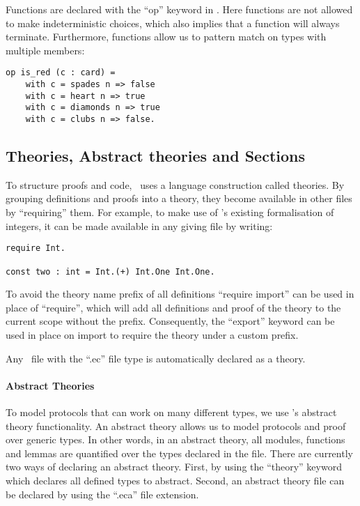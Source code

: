 \noindent
Functions are declared with the ``op'' keyword in \easycrypt.
Here functions are not allowed to make indeterministic choices, which also
implies that a function will always terminate.
Furthermore, functions allow us to pattern match on types with
multiple members:
\begin{lstlisting}
op is_red (c : card) =
    with c = spades n => false
    with c = heart n => true
    with c = diamonds n => true
    with c = clubs n => false.
\end{lstlisting}


\subsection{Theories, Abstract theories and Sections}
\label{sec:ec_theories}
To structure proofs and code, \easycrypt\ uses a language construction called
theories. By grouping definitions and proofs into a theory, they become available
in other files by ``requiring'' them. For example, to make use of \easycrypt's
existing formalisation of integers, it can be made available in any giving file
by writing:

\begin{lstlisting}
require Int.

const two : int = Int.(+) Int.One Int.One.
\end{lstlisting}

To avoid the theory name prefix of all definitions ``require import'' can be
used in place of ``require'', which will add all definitions and proof of the
theory to the current scope without the prefix. Consequently, the ``export''
keyword can be used in place on import to require the theory under a custom prefix.

Any \easycrypt\ file with the ``.ec'' file type is automatically declared as a
theory.

\paragraph{Abstract Theories}
To model protocols that can work on many different
types, we use \easycrypt's abstract theory functionality. An abstract theory allows us to model
protocols and proof over generic types. In other words, in an abstract theory,
all modules, functions and lemmas are quantified over the types declared in the file.
There are currently two ways of declaring an abstract theory. First, by using the
``theory'' keyword which declares all defined types to abstract.
Second, an abstract theory file can be declared by using the ``.eca'' file extension.

